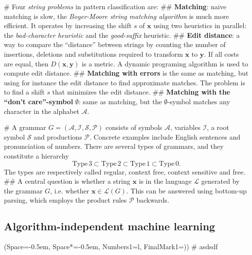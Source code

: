 \documentclass[12pt, a4paper]{article}
\newcommand{\listSpace}{-0.5em}%
\newcommand{\vect}[1]{\bm{#1}}
\begin{document}
\begin{easylist}[itemize]
# Four \emph{string problems} in pattern classification are:
## \textbf{Matching}: naive matching is slow, the \emph{Boyer-Moore string matching algorithm} is much more efficient.
It operates by increasing the shift $s$ of $\vect{x}$ using two heuristics in parallel: the \emph{bad-character heuristic} and the \emph{good-suffix} heuristic.
## \textbf{Edit distance}: a way to compare the ``distance'' between strings by counting the number of insertions, deletions and substitutions required to transform $\vect{x}$ to $\vect{y}$.
If all costs are equal, then $D(\vect{x}, \vect{y})$ is a metric.
A dynamic programing algorithm is used to compute edit distance.
## \textbf{Matching with errors} is the same as matching, but using for instance the edit distance to find approximate matches. 
The problem is to find a shift $s$ that minimizes the edit distance.
## \textbf{Matching with the ``don't care''-symbol} $\emptyset$: same as matching, but the $\emptyset$-symbol matches any character in the alphabet $\mathcal{A}$.

# A grammar $G = (\mathcal{A}, \mathcal{I}, \mathcal{S}, \mathcal{P})$ consists of symbols $\mathcal{A}$, variables $\mathcal{I}$, a root symbol $\mathcal{S}$ and productions $\mathcal{P}$.
Concrete examples include English sentences and pronunciation of numbers.
There are several types of grammars, and they constitute a hierarchy
\begin{equation*}
	\text{Type} \, 3 \subset \text{Type} \, 2 \subset \text{Type} \, 1 \subset \text{Type} \, 0. 
\end{equation*}
The types are respectively called regular, context free, context sensitive and free.
## A central question is whether a string $\vect{x}$ is in the language $\mathcal{L}$ generated by the grammar $G$, i.e. whether $\vect{x} \in \mathcal{L}(G)$. This can be answered using bottom-up parsing, which employs the product rules $\mathcal{P}$ backwards.
\end{easylist}























\subsection{Algorithm-independent machine learning}
\begin{easylist}[itemize]
	\ListProperties(Space=\listSpace, Space*=\listSpace, Numbers1=l, FinalMark1={)})
	# asdsdf
\end{easylist}
\end{document}
